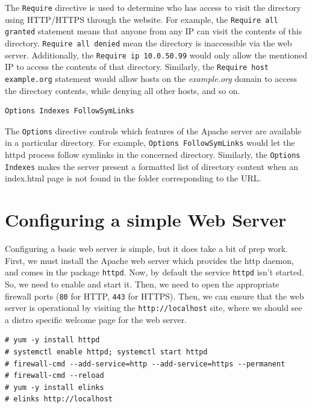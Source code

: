 The \verb|Require| directive is used to determine who has access to visit the directory using HTTP/HTTPS through the website. For example, the \verb|Require all granted| statement means that anyone from any IP can visit the contents of this directory. \verb|Require all denied| mean the directory is inaccessible via the web server. Additionally, the \verb|Require ip 10.0.50.99| would only allow the mentioned IP to access the contents of that directory. Similarly, the \verb|Require host example.org| statement would allow hosts on the \textit{example.org} domain to access the directory contents, while denying all other hosts, and so on.

\vspace{-15pt}
\begin{verbatim}
Options Indexes FollowSymLinks
\end{verbatim}
\vspace{-10pt}	

The \verb|Options| directive controls which features of the Apache server are available in a particular directory. For example, \verb|Options FollowSymLinks| would let the httpd process follow symlinks in the concerned directory. Similarly, the \verb|Options Indexes| makes the server present a formatted list of directory content when an index.html page is not found in the folder corresponding to the URL. 

\section{Configuring a simple Web Server}
Configuring a basic web server is simple, but it does take a bit of prep work. First, we must install the Apache web server which provides the http daemon, and comes in the package \verb|httpd|. Now, by default the service \verb|httpd| isn't started. So, we need to enable and start it. Then, we need to open the appropriate firewall ports (\verb|80| for HTTP, \verb|443| for HTTPS). Then, we can ensure that the web server is operational by visiting the \verb|http://localhost| site, where we should see a distro specific welcome page for the web server.

\vspace{-15pt}
\begin{verbatim}
# yum -y install httpd
# systemctl enable httpd; systemctl start httpd
# firewall-cmd --add-service=http --add-service=https --permanent
# firewall-cmd --reload
# yum -y install elinks
# elinks http://localhost
\end{verbatim}
\vspace{-10pt}	

